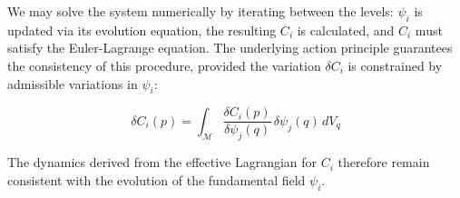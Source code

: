 We may solve the system numerically by iterating between the levels: \(\psi_i\) is updated via its evolution equation, the resulting \(C_i\) is calculated, and \(C_i\) must satisfy the Euler-Lagrange equation. The underlying action principle guarantees the consistency of this procedure, provided the variation \(\delta C_i\) is constrained by admissible variations in \(\psi_i\):

\begin{equation}
\delta C_i(p) = \int_{\mathcal{M}} \frac{\delta C_i(p)}{\delta \psi_j(q)} \, \delta \psi_j(q) \, dV_q
\end{equation}

The dynamics derived from the effective Lagrangian for \(C_i\) therefore remain consistent with the evolution of the fundamental field \(\psi_i\).
